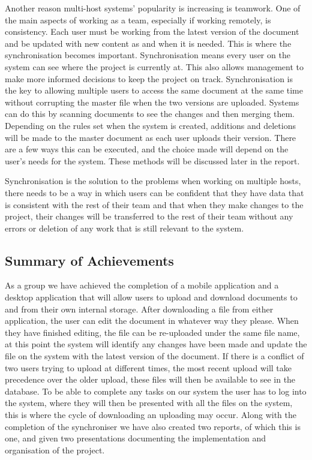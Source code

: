 \documentclass[11pt]{article}
\begin{document}
Another reason multi-host systems’ popularity is increasing is teamwork. One of the main aspects of working as a team, especially if working remotely, is consistency. Each user must be working from the latest version of the document and be updated with new content as and when it is needed. This is where the synchronisation becomes important. Synchronisation means every user on the system can see where the project is currently at. This also allows management to make more informed decisions to keep the project on track. Synchronisation is the key to allowing multiple users to access the same document at the same time without corrupting the master file when the two versions are uploaded. Systems can do this by scanning documents to see the changes and then merging them. Depending on the rules set when the system is created, additions and deletions will be made to the master document as each user uploads their version. There are a few ways this can be executed, and the choice made will depend on the user’s needs for the system. These methods will be discussed later in the report.

Synchronisation is the solution to the problems when working on multiple hosts, there needs to be a way in which users can be confident that they have data that is consistent with the rest of their team and that when they make changes to the project, their changes will be transferred to the rest of their team without any errors or deletion of any work that is still relevant to the system.

\subsection{Summary of Achievements}

As a group we have achieved the completion of a mobile application and a desktop application that will allow users to upload and download documents to and from their own internal storage. After downloading a file from either application, the user can edit the document in whatever way they please. When they have finished editing, the file can be re-uploaded under the same file name, at this point the system will identify any changes have been made and update the file on the system with the latest version of the document. If there is a conflict of two users trying to upload at different times, the most recent upload will take precedence over the older upload, these files will then be available to see in the database. To be able to complete any tasks on our system the user has to log into the system, where they will then be presented with all the files on the system, this is where the cycle of downloading an uploading may occur. 
Along with the completion of the synchroniser we have also created two reports, of which this is one, and given two presentations documenting the implementation and organisation of the project.
\end{document}
